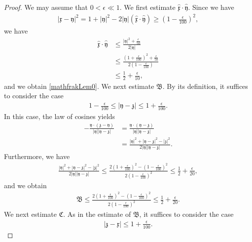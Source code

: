 \documentclass[10pt,a4paper]{amsart}
\numberwithin{equation}{section}
\begin{document}
\begin{proof}
We may assume that $0<\epsilon\ll 1$. We first estimate
$\hat{\mathfrak{x}}\cdot\hat{\mathfrak{y}}$. Since we have
\begin{align*}
|\mathfrak{x}-\mathfrak{y}|^2
=1+|\mathfrak{y}|^2
-2|\mathfrak{y}|
\left(\hat{\mathfrak{x}}\cdot\hat{\mathfrak{y}}\right)
\geq
\left(1-\frac{\epsilon}{100}\right)^2,
\end{align*}
we have
\begin{align*}
\hat{\mathfrak{x}}\cdot\hat{\mathfrak{y}}
&\leq
\frac{|\mathfrak{y}|^2+\frac{\epsilon}{50}}
{2|\mathfrak{y}|}
\\
&\leq
\frac{\left(1+\frac{\epsilon}{100}\right)^2+\frac{\epsilon}{50}}
{2\left(1-\frac{\epsilon}{100}\right)}
\\
&\leq
\frac{1}{2}+\frac{\epsilon}{10},
\end{align*}
and we obtain \eqref{mathfrakLem0}. We next estimate $\mathfrak{B}$. By its definition, it suffices to consider the case
\begin{align*}
1-\frac{\epsilon}{100}\leq |\mathfrak{y}-\mathfrak{z}|\leq 1+\frac{\epsilon}{100}.
\end{align*}
In this case, the law of cosines yields
\begin{align*}
-\frac{\mathfrak{y}\cdot(\mathfrak{z}-\mathfrak{y})}
{|\mathfrak{y}||\mathfrak{y}-\mathfrak{z}|}
&=
\frac{\mathfrak{y}\cdot(\mathfrak{y}-\mathfrak{z})}
{|\mathfrak{y}||\mathfrak{y}-\mathfrak{z}|}
\\
&=
\frac{|\mathfrak{y}|^2+|\mathfrak{y}-\mathfrak{z}|^2
-|\mathfrak{z}|^2}
{2|\mathfrak{y}||\mathfrak{y}-\mathfrak{z}|}.
\end{align*}
Furthermore, we have
\begin{align*}
\frac{|\mathfrak{y}|^2+|\mathfrak{y}-\mathfrak{z}|^2
-|\mathfrak{z}|^2}
{2|\mathfrak{y}||\mathfrak{y}-\mathfrak{z}|}\leq \frac{2(1+\frac{\epsilon}{100})^2-(1-\frac{\epsilon}{100})^2}{2(1-\frac{\epsilon}{100})^2}\leq \frac{1}{2}+\frac{\epsilon}{20},
\end{align*}
and we obtain
\begin{align}\label{mathfrakBes}
\mathfrak{B}\leq \frac{2(1+\frac{\epsilon}{100})^2-(1-\frac{\epsilon}{100})^2}{2(1-\frac{\epsilon}{100})^2}\leq \frac{1}{2}+\frac{\epsilon}{20}.
\end{align}
We next estimate $\mathfrak{C}$. As in the estimate of $\mathfrak{B}$, it suffices to consider the case
\begin{align*}
|\mathfrak{z}-\mathfrak{x}|
\leq 1+\frac{\epsilon}{100}.

\end{align*}
\end{proof}
\end{document}
